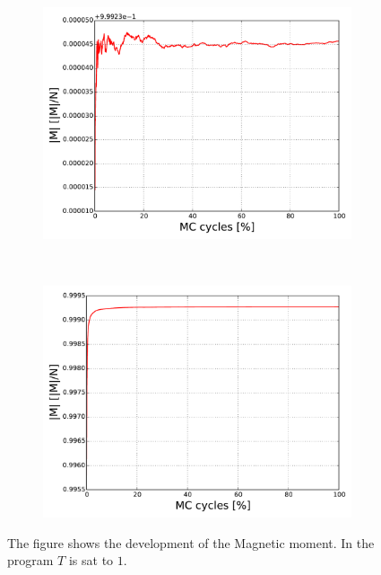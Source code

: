 \begin{figure}[H]
    \centering
    \begin{subfigure}{0.5\textwidth}
        \centering
        \includegraphics[width=\linewidth]{result/bilder/20x20/M-N20-T1}
        \caption{}
    \end{subfigure}%
    ~ 
    \begin{subfigure}{0.5\textwidth}
        \centering
        \includegraphics[width=\linewidth]{result/bilder/20x20/M-N20-T1-RNG}
        \caption{}
    \end{subfigure}
    \caption{The figure shows the development of the Magnetic moment. In the program $T$ is sat to $1$. }
    \label{fig:}
\end{figure}

